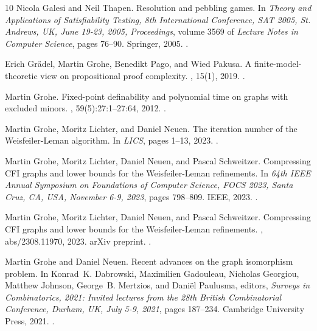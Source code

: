 \documentclass[10pt,a4paper]{article}
\begin{document}
\begin{thebibliography}{10}
Nicola Galesi and Neil Thapen.
\newblock Resolution and pebbling games.
\newblock In {\em Theory and Applications of Satisfiability Testing, 8th
  International Conference, {SAT} 2005, St. Andrews, UK, June 19-23, 2005,
  Proceedings}, volume 3569 of {\em Lecture Notes in Computer Science}, pages
  76--90. Springer, 2005.
\newblock \href {https://doi.org/10.1007/11499107\_6}
  {}.

Erich Gr{\"{a}}del, Martin Grohe, Benedikt Pago, and Wied Pakusa.
\newblock A finite-model-theoretic view on propositional proof complexity.
, 15(1), 2019.
\newblock \href {https://doi.org/10.23638/LMCS-15(1:4)2019}
  {}.

Martin Grohe.
\newblock Fixed-point definability and polynomial time on graphs with excluded
  minors.
, 59(5):27:1--27:64, 2012.
\newblock \href {https://doi.org/10.1145/2371656.2371662}
  {}.

Martin Grohe, Moritz Lichter, and Daniel Neuen.
\newblock The iteration number of the {W}eisfeiler-{L}eman algorithm.
\newblock In {\em {LICS}}, pages 1--13, 2023.
\newblock \href {https://doi.org/10.1109/LICS56636.2023.10175741}
  {}.

Martin Grohe, Moritz Lichter, Daniel Neuen, and Pascal Schweitzer.
\newblock Compressing {CFI} graphs and lower bounds for the
  {W}eisfeiler-{L}eman refinements.
\newblock In {\em 64th {IEEE} Annual Symposium on Foundations of Computer
  Science, {FOCS} 2023, Santa Cruz, CA, USA, November 6-9, 2023}, pages
  798--809. {IEEE}, 2023.
\newblock \href {https://doi.org/10.1109/FOCS57990.2023.00052}
  {}.

Martin Grohe, Moritz Lichter, Daniel Neuen, and Pascal Schweitzer.
\newblock Compressing {CFI} graphs and lower bounds for the
  {W}eisfeiler-{L}eman refinements.
, abs/2308.11970, 2023.
\newblock arXiv preprint.
\newblock \href {https://doi.org/10.48550/ARXIV.2308.11970}
  {}.

Martin Grohe and Daniel Neuen.
\newblock Recent advances on the graph isomorphism problem.
\newblock In Konrad~K. Dabrowski, Maximilien Gadouleau, Nicholas Georgiou,
  Matthew Johnson, George~B. Mertzios, and Dani{\"{e}}l Paulusma, editors, {\em
  Surveys in Combinatorics, 2021: Invited lectures from the 28th British
  Combinatorial Conference, Durham, UK, July 5-9, 2021}, pages 187--234.
  Cambridge University Press, 2021.
\newblock \href {https://doi.org/10.1017/9781009036214.006}
  {}.


\end{thebibliography}
\end{document}
